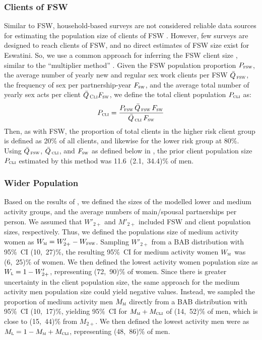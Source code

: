 \subsubsection{Clients of FSW}\label{mod.par.size.cli}
Similar to FSW, household-based surveys are not considered reliable data sources
for estimating the population size of clients of FSW \cite{Behanzin2013}.
However, few surveys are designed to reach clients of FSW,
and no direct estimates of FSW size exist for Eswatini.
So, we use a common approach for inferring the FSW client size \cite{Cote2004},
similar to the ``multiplier method'' \cite{Morison2001}.
Given the FSW population proportion $P_{\textsc{fsw}}$,
the average number of yearly new and regular sex work clients per FSW $\bar{Q}_{\,\textsc{fsw}}$,
the frequency of sex per partnership-year $F_{\textsc{sw}}$, and
the average total number of yearly sex acts per client
$\bar{Q}_{\,\textsc{Cli}} F_{\textsc{sw}}$,
we define the total client population $P_{\textsc{cli}}$ as:
\begin{equation}
  P_{\textsc{cli}} = \frac{P_{\textsc{fsw}}\,\bar{Q}_{\,\textsc{fsw}}\,F_{\textsc{sw}}}
                                            {\bar{Q}_{\,\textsc{cli}}\,F_{\textsc{sw}}}
\end{equation}
Then, as with FSW, the proportion of total clients in the higher risk client group
is defined as 20\% of all clients, and likewise for the lower risk group at 80\%.
Using $\bar{Q}_{\,\textsc{fsw}}$, $\bar{Q}_{\,\textsc{cli}}$, and $F_{\textsc{sw}}$
as defined below in , the prior client population size $P_{\textsc{cli}}$
estimated by this method was 11.6~(2.1,~34.4)\% of men.
\subsubsection{Wider Population}\label{mod.par.size.wp}
Based on the results of ,
we defined the sizes of the modelled lower and medium activity groups,
and the average numbers of main/spousal partnerships per person.
We assumed that $W'_{2+}$ and $M'_{2+}$ included FSW and client population sizes, respectively.
Thus, we defined the populations size of medium activity women as
$W_{\textsc{m}} = W'_{2+} - W_{\textsc{fsw}}$.
Sampling $W'_{2+}$ from a BAB distribution with 95\%~CI (10,~27)\%,
the resulting 95\%~CI for medium activity women $W_{\textsc{m}}$ was (6,~25)\% of women.
We then defined the lowest activity women population size as $W_{\textsc{l}} = 1 - W'_{2+}$,
representing (72,~90)\% of women.
Since there is greater uncertainty in the client population size,
the same approach for the medium activity men population size could yield negative values.
Instead, we sampled the proportion of medium activity men $M_{\textsc{m}}$ directly from
a BAB distribution with 95\%~CI (10,~17)\%, yielding
95\%~CI for $M_{\textsc{m}} + M_{\textsc{cli}}$ of (14,~52)\% of men,
which is close to (15,~44)\% from $M_{2+}$.
We then defined the lowest activity men were as
$M_{\textsc{l}} = 1 - M_{\textsc{m}} + M_{\textsc{cli}}$,
representing (48,~86)\% of men.
